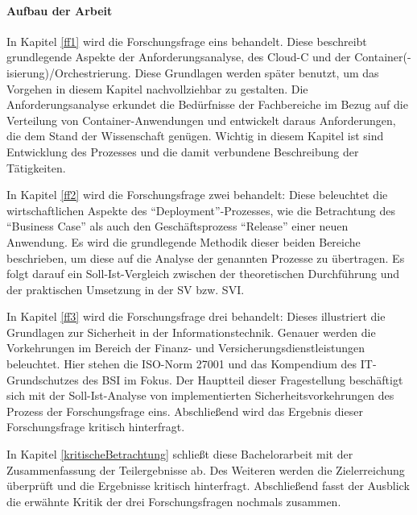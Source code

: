 \paragraph{Aufbau der Arbeit}
In Kapitel \vref{ff1} wird die Forschungsfrage eins behandelt. Diese beschreibt grundlegende Aspekte der Anforderungsanalyse, des \acl{Cloud-C} und der Container(-isierung)/Orchestrierung. Diese Grundlagen werden später benutzt, um das Vorgehen in diesem Kapitel nachvollziehbar zu gestalten. Die Anforderungsanalyse erkundet die Bedürfnisse der Fachbereiche im Bezug auf die Verteilung von Container-Anwendungen und entwickelt daraus Anforderungen, die dem Stand der Wissenschaft genügen. Wichtig in diesem Kapitel ist sind Entwicklung des Prozesses und die damit verbundene Beschreibung der Tätigkeiten.
\par
In Kapitel \vref{ff2} wird die Forschungsfrage zwei behandelt: Diese beleuchtet die wirtschaftlichen Aspekte des \enquote{Deployment}-Prozesses, wie die Betrachtung des \enquote{Business Case} als auch den Geschäftsprozess \enquote{Release} einer neuen Anwendung. Es wird die grundlegende Methodik dieser beiden Bereiche beschrieben, um diese auf die Analyse der genannten Prozesse zu übertragen. Es folgt darauf ein Soll-Ist-Vergleich zwischen der theoretischen Durchführung und der praktischen Umsetzung in der \ac{SV} bzw. \ac{SVI}.
\par
In Kapitel \vref{ff3} wird die Forschungsfrage drei behandelt: Dieses illustriert die Grundlagen zur Sicherheit in der Informationstechnik. Genauer werden die Vorkehrungen im Bereich der Finanz- und Versicherungsdienstleistungen beleuchtet. Hier stehen die ISO-Norm 27001 und das Kompendium des IT-Grundschutzes des \ac{BSI} im Fokus. Der Hauptteil dieser Fragestellung beschäftigt sich mit der Soll-Ist-Analyse von implementierten Sicherheitsvorkehrungen des Prozess der Forschungsfrage eins. Abschließend wird das Ergebnis dieser Forschungsfrage kritisch hinterfragt.
\par
In Kapitel \vref{kritischeBetrachtung} schließt diese Bachelorarbeit mit der Zusammenfassung der Teilergebnisse ab. Des Weiteren werden die Zielerreichung überprüft und die Ergebnisse kritisch hinterfragt. Abschließend fasst der Ausblick die erwähnte Kritik der drei Forschungsfragen nochmals zusammen. 
